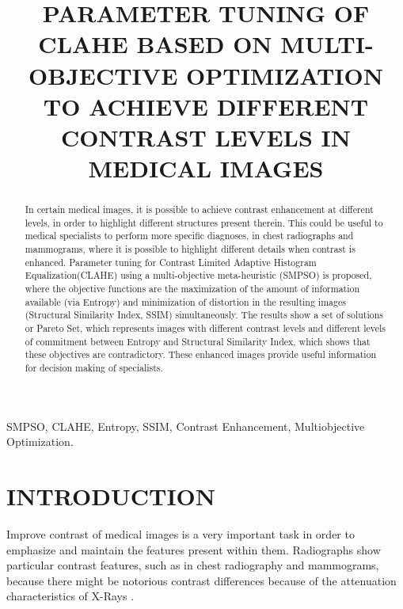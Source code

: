 \documentclass[spanish,twocolumn]{article}
\title{PARAMETER TUNING OF CLAHE BASED ON MULTI-OBJECTIVE OPTIMIZATION TO ACHIEVE DIFFERENT CONTRAST LEVELS IN MEDICAL IMAGES}
\begin{document}
%
\maketitle
%
\begin{abstract}
In certain medical images, it is possible to achieve contrast enhancement at different levels, in order to highlight different structures present therein. This could be useful to medical specialists to perform more specific diagnoses, in chest radiographs and mammograms, where it is possible to highlight different details when contrast is enhanced. Parameter tuning for Contrast Limited Adaptive Histogram Equalization(CLAHE) using a multi-objective meta-heuristic (SMPSO) is proposed, where the objective functions are the maximization of the amount of information available (via Entropy) and minimization of distortion in the resulting images (Structural Similarity Index, SSIM) simultaneously. The results show a set of solutions or Pareto Set, which represents images with different contrast levels and different levels of commitment between Entropy and Structural Similarity Index, which shows that these objectives are contradictory. These enhanced images provide useful information for decision making of specialists.

\end{abstract}
%
\begin{keywords}
SMPSO, CLAHE, Entropy, SSIM, Contrast Enhancement, Multiobjective Optimization.
\end{keywords}
%
\section{INTRODUCTION}
\label{sec:intro}

Improve contrast of medical images is a very important task in order to emphasize and maintain the features present within them. Radiographs show particular contrast features, such as in chest radiography and mammograms, because there might be notorious contrast differences because of the attenuation characteristics of X-Rays \cite{chang1998image}. 
\end{document}
